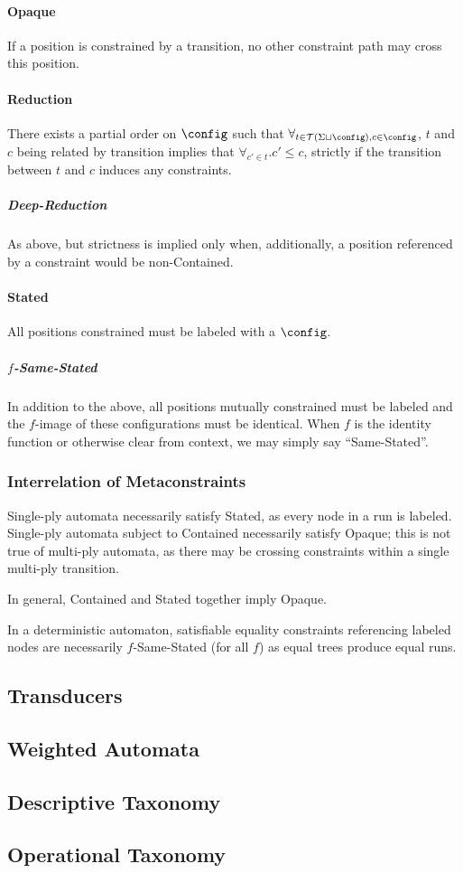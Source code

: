 \paragraph{Opaque} If a position is constrained by a transition, no other
constraint path may cross this position. 

\paragraph{Reduction} There exists a partial order on $\config$ such that
$\forall_{t \in \mathcal{T}(\Sigma \sqcup \config), c \in \config}$, $t$ and
$c$ being related by transition implies that $\forall_{c' \in t} . c' \le
c$, strictly if the transition between $t$ and $c$ induces any constraints.

\subparagraph{Deep-Reduction} As above, but strictness is implied only when,
additionally, a position referenced by a constraint would be non-Contained.

\paragraph{Stated} All positions constrained must be labeled with a
$\config$.

\subparagraph{$f$-Same-Stated} In addition to the above, all positions
mutually constrained must be labeled and the $f$-image of these
configurations must be identical.  When $f$ is the identity function or
otherwise clear from context, we may simply say ``Same-Stated''.

\subsubsection{Interrelation of Metaconstraints}

Single-ply automata necessarily satisfy Stated, as every node in a run is
labeled.  Single-ply automata subject to Contained necessarily satisfy
Opaque; this is not true of multi-ply automata, as there may be crossing
constraints within a single multi-ply transition.

In general, Contained and Stated together imply Opaque.

In a deterministic automaton, satisfiable equality constraints referencing
labeled nodes are necessarily $f$-Same-Stated (for all $f$) as equal trees
produce equal runs.

\subsection{Transducers}

\subsection{Weighted Automata}

\subsection{Descriptive Taxonomy}

\subsection{Operational Taxonomy}
